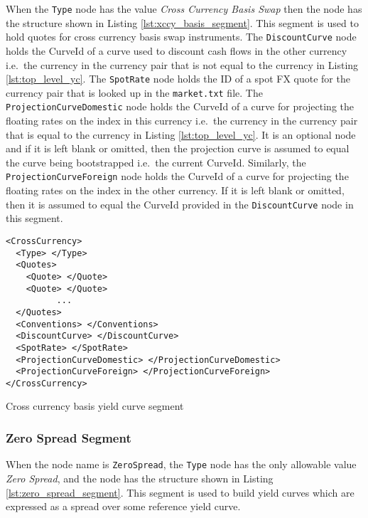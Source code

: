 When the \lstinline!Type! node has the value \emph{Cross Currency Basis Swap} then the node has the structure shown in 
Listing \ref{lst:xccy_basis_segment}. This segment is used to hold quotes for cross currency basis swap instruments. The 
\lstinline!DiscountCurve! node holds the CurveId of a curve used to discount cash flows in the other currency i.e.\ the 
currency in the currency pair that is not equal to the currency in Listing \ref{lst:top_level_yc}. The 
\lstinline!SpotRate! node holds the ID of a spot FX quote for the currency pair that is looked up in the {\tt market.txt} 
file. The \lstinline!ProjectionCurveDomestic! node holds the CurveId of a curve for projecting the floating rates on the 
index in this currency i.e.\ the currency in the currency pair that is equal to the currency in Listing 
\ref{lst:top_level_yc}. It is an optional node and if it is left blank or omitted, then the projection curve is assumed to 
equal the curve being bootstrapped i.e.\ the current CurveId. Similarly, the \lstinline!ProjectionCurveForeign! node holds 
the CurveId of a curve for projecting the floating rates on the index in the other currency. If it is left blank or 
omitted, then it is assumed to equal the CurveId provided in the \lstinline!DiscountCurve! node in this segment.

\begin{listing}[H]
\begin{verbatim}
<CrossCurrency>
  <Type> </Type>
  <Quotes>
    <Quote> </Quote>
    <Quote> </Quote>
          ...
  </Quotes>
  <Conventions> </Conventions>
  <DiscountCurve> </DiscountCurve>
  <SpotRate> </SpotRate>
  <ProjectionCurveDomestic> </ProjectionCurveDomestic>
  <ProjectionCurveForeign> </ProjectionCurveForeign>
</CrossCurrency>
\end{verbatim}
\caption{Cross currency basis yield curve segment}
\label{lst:xccy_basis_segment}
\end{listing}

\subsubsection*{Zero Spread Segment}

When the node name is \lstinline!ZeroSpread!, the \lstinline!Type!
node has the only allowable value \emph{Zero Spread},  and the node has the structure shown in 
Listing \ref{lst:zero_spread_segment}. This segment is used to build yield
curves which are expressed as a spread over some reference yield curve.

